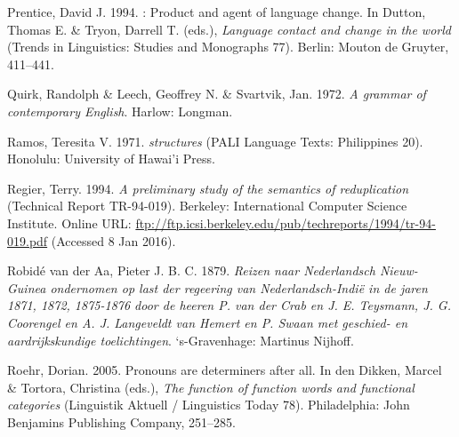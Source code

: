 \begin{styleCitaviBibliographyEntry}
Prentice, David J. 1994. : Product and agent of language change. In Dutton, Thomas E. \& Tryon, Darrell T. (eds.), \textit{Language contact and change in the  world} (Trends in Linguistics: Studies and Monographs 77). Berlin: Mouton de Gruyter, 411–441.
\end{styleCitaviBibliographyEntry}

\begin{styleCitaviBibliographyEntry}
Quirk, Randolph \& Leech, Geoffrey N. \& Svartvik, Jan. 1972. \textit{A grammar of contemporary English}. Harlow: Longman.
\end{styleCitaviBibliographyEntry}

\begin{styleCitaviBibliographyEntry}
Ramos, Teresita V. 1971. \textit{ structures} (PALI Language Texts: Philippines 20). Honolulu: University of Hawai’i Press.
\end{styleCitaviBibliographyEntry}

\begin{styleCitaviBibliographyEntry}
Regier, Terry. 1994. \textit{A preliminary study of the semantics of reduplication} (Technical Report TR-94-019). Berkeley: International Computer Science Institute. Online URL: \url{ftp://ftp.icsi.berkeley.edu/pub/techreports/1994/tr-94-019.pdf} (Accessed 8 Jan 2016).
\end{styleCitaviBibliographyEntry}

\begin{styleCitaviBibliographyEntry}
Robidé van der Aa, Pieter J. B. C. 1879. \textit{Reizen naar Nederlandsch Nieuw-Guinea ondernomen op last der regeering van Nederlandsch-Indië in de jaren 1871, 1872, 1875-1876 door de heeren P. van der Crab en J. E. Teysmann, J. G. Coorengel en A. J. Langeveldt van Hemert en P. Swaan met geschied- en aardrijkskundige toelichtingen}. ‘s-Gravenhage: Martinus Nijhoff.
\end{styleCitaviBibliographyEntry}

\begin{styleCitaviBibliographyEntry}
Roehr, Dorian. 2005. Pronouns are determiners after all. In den Dikken, Marcel \& Tortora, Christina (eds.), \textit{The function of function words and functional categories} (Linguistik Aktuell / Linguistics Today 78). Philadelphia: John Benjamins Publishing Company, 251–285.
\end{styleCitaviBibliographyEntry}

